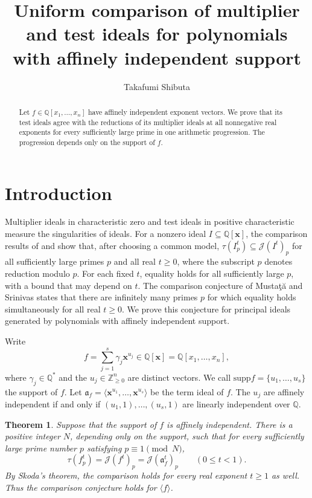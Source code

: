 \documentclass[11pt]{amsart}
\title[Uniform comparison for affinely independent support]{Uniform comparison of multiplier and test ideals for polynomials with affinely independent support}
\author{Takafumi Shibuta}
\date{}
\numberwithin{equation}{section}
\newtheorem{theorem}{Theorem}[section]
\theoremstyle{definition}
\newcommand{\J}{\mathcal J}
\newcommand{\aideal}{\mathfrak a}
\newcommand{\supp}{\mathrm{supp}}
\newcommand{\Q}{\mathbb Q}
\newcommand{\Z}{\mathbb Z}
\newcommand{\xx}{\boldsymbol{x}}
\begin{document}
\begin{abstract}
Let $f\in\Q[x_1,\ldots,x_n]$ have affinely independent exponent vectors.
We prove that its test ideals agree with the reductions of its multiplier
ideals at all nonnegative real exponents for every sufficiently large prime in one
arithmetic progression. The progression depends only on the support of $f$.
\end{abstract}
\maketitle

\section{Introduction}

Multiplier ideals in characteristic zero and test ideals in positive
characteristic measure the singularities of ideals. For a nonzero ideal
$I\subseteq\Q[\xx]$, the comparison results of \cite{HY} and \cite[Section~4]{MS} show that, after choosing
a common model, $\tau(I_p^t)\subseteq\J(I^t)_p$ for all sufficiently large
primes $p$ and all real $t\ge0$, where the subscript $p$ denotes reduction
modulo $p$. For each fixed $t$, equality holds for all sufficiently large
$p$, with a bound that may depend on $t$.
The comparison conjecture of Musta\c{t}\u{a} and Srinivas
\cite[Conjecture~1.2]{MS} states that there are infinitely many
primes $p$ for which equality holds simultaneously for all real $t\ge0$. We prove this conjecture
for principal ideals generated by polynomials with affinely independent support.

Write
\[
 f=\sum_{j=1}^s\gamma_j\xx^{u_j}\in\Q[\xx]=\Q[x_1,\dots,x_n],
\]
where $\gamma_j\in\Q^*$ and the $u_j\in\Z_{\ge 0}^n$ are distinct vectors. 
We call $\supp f=\{u_1,\dots ,u_s\}$ the support of $f$. 
Let
$\aideal_f=\langle\xx^{u_1},\ldots,\xx^{u_s}\rangle$ be the term ideal of $f$.
The $u_j$ are affinely independent if and only if $(u_1,1),\dots,(u_s,1)$ are linearly independent over $\Q$. 

\begin{theorem}\label{thm:main}
Suppose that the support of $f$ is affinely independent.
There is a positive integer $N$, depending only on the support, such that
for every sufficiently large prime number $p$ satisfying $p\equiv1\pmod N$, 
\[
 \tau(f_p^{t})=\J(f^{t})_p
   =\J(\aideal_f^t)_p\qquad(0\le t<1).
\]
By Skoda's theorem, the comparison holds for every real exponent $t\ge1$ as well.
Thus the comparison conjecture holds for $\langle f\rangle$.
\end{theorem}
\end{document}
